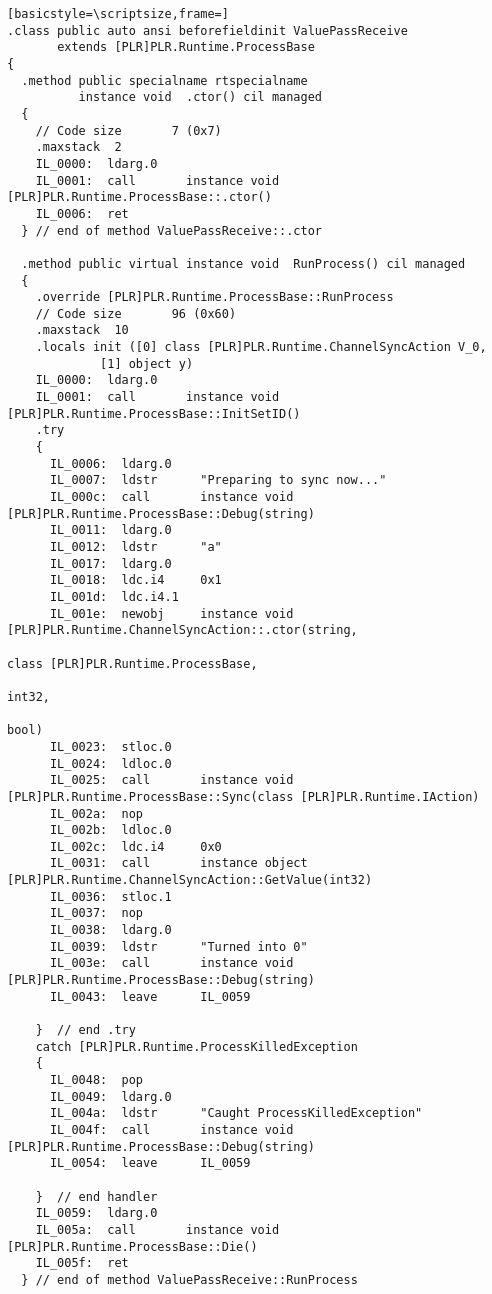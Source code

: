 \begin{lstlisting}[basicstyle=\scriptsize,frame=]
.class public auto ansi beforefieldinit ValuePassReceive
       extends [PLR]PLR.Runtime.ProcessBase
{
  .method public specialname rtspecialname 
          instance void  .ctor() cil managed
  {
    // Code size       7 (0x7)
    .maxstack  2
    IL_0000:  ldarg.0
    IL_0001:  call       instance void [PLR]PLR.Runtime.ProcessBase::.ctor()
    IL_0006:  ret
  } // end of method ValuePassReceive::.ctor

  .method public virtual instance void  RunProcess() cil managed
  {
    .override [PLR]PLR.Runtime.ProcessBase::RunProcess
    // Code size       96 (0x60)
    .maxstack  10
    .locals init ([0] class [PLR]PLR.Runtime.ChannelSyncAction V_0,
             [1] object y)
    IL_0000:  ldarg.0
    IL_0001:  call       instance void [PLR]PLR.Runtime.ProcessBase::InitSetID()
    .try
    {
      IL_0006:  ldarg.0
      IL_0007:  ldstr      "Preparing to sync now..."
      IL_000c:  call       instance void [PLR]PLR.Runtime.ProcessBase::Debug(string)
      IL_0011:  ldarg.0
      IL_0012:  ldstr      "a"
      IL_0017:  ldarg.0
      IL_0018:  ldc.i4     0x1
      IL_001d:  ldc.i4.1
      IL_001e:  newobj     instance void [PLR]PLR.Runtime.ChannelSyncAction::.ctor(string,
                                                                                   class [PLR]PLR.Runtime.ProcessBase,
                                                                                   int32,
                                                                                   bool)
      IL_0023:  stloc.0
      IL_0024:  ldloc.0
      IL_0025:  call       instance void [PLR]PLR.Runtime.ProcessBase::Sync(class [PLR]PLR.Runtime.IAction)
      IL_002a:  nop
      IL_002b:  ldloc.0
      IL_002c:  ldc.i4     0x0
      IL_0031:  call       instance object [PLR]PLR.Runtime.ChannelSyncAction::GetValue(int32)
      IL_0036:  stloc.1
      IL_0037:  nop
      IL_0038:  ldarg.0
      IL_0039:  ldstr      "Turned into 0"
      IL_003e:  call       instance void [PLR]PLR.Runtime.ProcessBase::Debug(string)
      IL_0043:  leave      IL_0059

    }  // end .try
    catch [PLR]PLR.Runtime.ProcessKilledException 
    {
      IL_0048:  pop
      IL_0049:  ldarg.0
      IL_004a:  ldstr      "Caught ProcessKilledException"
      IL_004f:  call       instance void [PLR]PLR.Runtime.ProcessBase::Debug(string)
      IL_0054:  leave      IL_0059

    }  // end handler
    IL_0059:  ldarg.0
    IL_005a:  call       instance void [PLR]PLR.Runtime.ProcessBase::Die()
    IL_005f:  ret
  } // end of method ValuePassReceive::RunProcess


\end{lstlisting}
